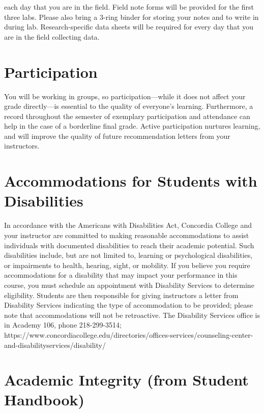 \documentclass{tufte-handout}
\begin{document}
\begin{fullwidth}
 each day that you are in the field. Field note forms will be provided for the first three labs. Please also bring a 3-ring binder for storing your notes and to write in during lab. Research-specific data sheets will be required for every day that you are in the field collecting data. 

\section{Participation}

You will be working in groups, so participation---while it does not affect your grade directly---is essential to the quality of everyone's learning. Furthermore, a record throughout the semester of exemplary participation and attendance can help in the case of a borderline final grade. Active participation nurtures learning, and will improve the quality of future recommendation letters from your instructors.  

\section{Accommodations for Students with Disabilities}

In accordance with the Americans with Disabilities Act, Concordia College and your instructor are committed to making reasonable accommodations to assist individuals with documented disabilities to reach their academic potential. Such disabilities include, but are not limited to, learning or psychological disabilities, or impairments to health, hearing, sight, or mobility. If you believe you require accommodations for a disability that may impact your performance in this course, you must schedule an appointment with Disability Services to determine eligibility. Students are then responsible for giving instructors a letter from Disability Services indicating the type of accommodation to be provided; please note that accommodations will not be retroactive. The Disability Services office is in Academy 106, phone 218-299-3514; https://www.concordiacollege.edu/directories/offices-services/counseling-center-and-disabilityservices/disability/ 







\end{fullwidth}

\newpage

\section{Academic Integrity (from Student Handbook)}
\end{document}
